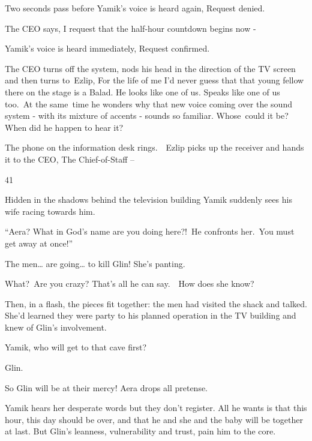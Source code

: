 \documentclass[twoside,11pt]{book}
\begin{document}
Two seconds pass before Yamik's voice is heard again, {\textquotedbl}Request denied.{\textquotedbl}

The CEO says, {\textquotedbl}I request that the half{}-hour countdown begins now -{\textquotedbl}

Yamik's voice is heard immediately, {\textquotedbl}Request confirmed.{\textquotedbl}

The CEO turns off the system, nods his head in the direction of the TV screen and then turns
to{\ }Ezlip, {\textquotedbl}For the life of me I'd never guess that that young
fellow there on the stage is a Balad. He looks like one of us. Speaks like one of us too.{\textquotedbl}\ At the
same\ time he wonders why that new voice coming over the sound system - with its mixture of accents - sounds so
familiar. Whose{\ }could it be? When did he happen to hear it?

The phone on the information desk rings.\ \ Ezlip picks up the receiver and hands it to the CEO, {\textquotedbl}The
Chief-of-Staff --{\textquotedbl}


\bigskip

41\ 

Hidden in the shadows behind the television building Yamik suddenly sees his wife racing towards him. 

{}``Aera? What in God's name are you doing here?!{\textquotedbl}\ He confronts her.\ {\textquotedbl}You must get away at
once!''\ 

{\textquotedbl}The men{\dots} are going{\dots} to kill Glin!{\textquotedbl} She{}'s panting.

{\textquotedbl}What?{\ }Are you crazy?{\textquotedbl} That's all he can
say.\ \ How does she know? 

Then, in a flash, the pieces fit together: the men had visited the shack and talked. She'd learned they were party to
his planned operation in the TV building and knew of Glin's involvement.

{\textquotedbl}Yamik, who will get to that cave first?{\textquotedbl} 

{\textquotedbl}Glin.{\textquotedbl} 

{\textquotedbl}So Glin will be at their mercy!{\textquotedbl} Aera drops all pretense. 

Yamik hears her desperate words but they don't register. All he wants is that this hour, this day should be over, and
that he and she and the baby will be together at last. But Glin's leanness, vulnerability and trust, pain him to the
core{.}
\end{document}
